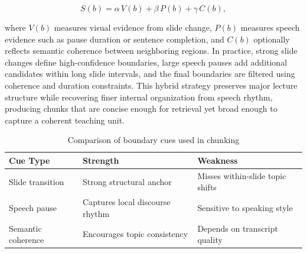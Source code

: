 \begin{equation}
S(b) = \alpha \, V(b) + \beta \, P(b) + \gamma \, C(b),
\end{equation}

where $V(b)$ measures visual evidence from slide change, $P(b)$ measures speech evidence such as pause duration or sentence completion, and $C(b)$ optionally reflects semantic coherence between neighboring regions. In practice, strong slide changes define high-confidence boundaries, large speech pauses add additional candidates within long slide intervals, and the final boundaries are filtered using coherence and duration constraints. This hybrid strategy preserves major lecture structure while recovering finer internal organization from speech rhythm, producing chunks that are concise enough for retrieval yet broad enough to capture a coherent teaching unit.

\begin{table}[H]
    \centering
    \caption{Comparison of boundary cues used in chunking}
    \begin{tabular}{@{}lll@{}}
        \toprule
        \textbf{Cue Type} & \textbf{Strength} & \textbf{Weakness} \\ \midrule
        Slide transition & Strong structural anchor & Misses within-slide topic shifts \\
        Speech pause & Captures local discourse rhythm & Sensitive to speaking style \\
        Semantic coherence & Encourages topic consistency & Depends on transcript quality \\ \bottomrule
    \end{tabular}
\end{table}